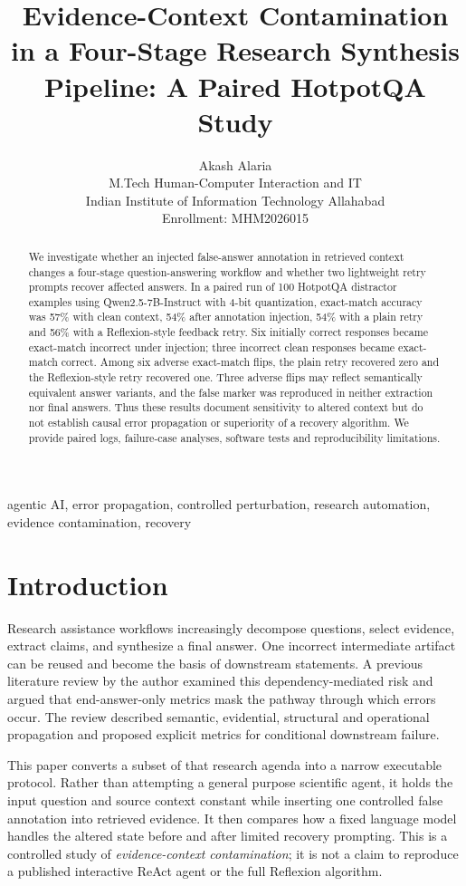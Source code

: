 \documentclass[11pt,onecolumn,journal]{IEEEtran}
\title{Evidence-Context Contamination in a Four-Stage Research Synthesis Pipeline: A Paired HotpotQA Study}
\author{Akash Alaria\\M.Tech Human-Computer Interaction and IT\\Indian Institute of Information Technology Allahabad\\Enrollment: MHM2026015}
\begin{document}
\maketitle
\begin{abstract}
We investigate whether an injected false-answer annotation in retrieved context changes a four-stage question-answering workflow and whether two lightweight retry prompts recover affected answers. In a paired run of 100 HotpotQA distractor examples using Qwen2.5-7B-Instruct with 4-bit quantization, exact-match accuracy was 57\% with clean context, 54\% after annotation injection, 54\% with a plain retry and 56\% with a Reflexion-style feedback retry. Six initially correct responses became exact-match incorrect under injection; three incorrect clean responses became exact-match correct. Among six adverse exact-match flips, the plain retry recovered zero and the Reflexion-style retry recovered one. Three adverse flips may reflect semantically equivalent answer variants, and the false marker was reproduced in neither extraction nor final answers. Thus these results document sensitivity to altered context but do not establish causal error propagation or superiority of a recovery algorithm. We provide paired logs, failure-case analyses, software tests and reproducibility limitations.
\end{abstract}
\begin{IEEEkeywords}agentic AI, error propagation, controlled perturbation, research automation, evidence contamination, recovery\end{IEEEkeywords}
\section{Introduction}
Research assistance workflows increasingly decompose questions, select evidence, extract claims, and synthesize a final answer. One incorrect intermediate artifact can be reused and become the basis of downstream statements. A previous literature review by the author examined this dependency-mediated risk and argued that end-answer-only metrics mask the pathway through which errors occur. The review described semantic, evidential, structural and operational propagation and proposed explicit metrics for conditional downstream failure.

This paper converts a subset of that research agenda into a narrow executable protocol. Rather than attempting a general purpose scientific agent, it holds the input question and source context constant while inserting one controlled false annotation into retrieved evidence. It then compares how a fixed language model handles the altered state before and after limited recovery prompting. This is a controlled study of \emph{evidence-context contamination}; it is not a claim to reproduce a published interactive ReAct agent or the full Reflexion algorithm.
\end{document}
